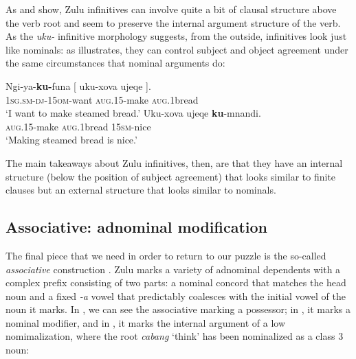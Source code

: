 \documentclass[output=paper,colorlinks,citecolor=brown]{langscibook}
\begin{document}
As  and  show, Zulu infinitives can involve quite a bit of clausal structure above the verb root and seem to preserve the internal argument structure of the verb. As the \textit{uku-} infinitive morphology suggests, from the outside, infinitives look just like nominals: as  illustrates, they can control subject and object agreement under the same circumstances that nominal arguments do:


\ea%
    \label{ex:halpert:9}
    \ea%
    \label{ex:halpert:9a}
    \gll    Ngi-ya-\textbf{ku-}funa [ uku-xova ujeqe ].\\
            1\textsc{sg}.\textsc{sm}-\textsc{dj}-15\textsc{om}-want {} \textsc{aug}.15-make \textsc{aug}.1bread\\
    \glt    `I want to make steamed bread.'
    \ex%
    \label{ex:halpert:9b}
    \gll    Uku-xova ujeqe \textbf{ku}-mnandi.\\
            \textsc{aug}.15-make \textsc{aug}.1bread 15\textsc{sm}-nice\\
    \glt    `Making steamed bread is nice.'
    \z 
\z 

The main takeaways about Zulu infinitives, then, are that they have an internal structure (below the position of subject agreement) that looks similar to finite clauses but an external structure that looks similar to nominals.

\subsection{Associative: adnominal modification}\label{sec:halpert:2.3}

The final piece that we need in order to return to our puzzle is the so-called \textit{associative} construction \citep{Sabelo1990,Halpert2015,Jones2018}. Zulu marks a variety of adnominal dependents with a complex prefix consisting of two parts: a nominal concord that matches the head noun and a fixed \textit{-a} vowel that predictably coalesces with the initial vowel of the noun it marks.  In , we can see the associative marking a possessor; in , it marks a nominal modifier, and in , it marks the internal argument of a low nomimalization, where the root \textit{cabang} `think' has been nominalized as a class 3 noun:
\end{document}
